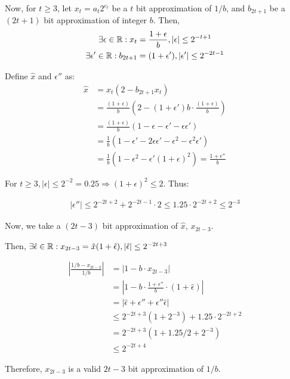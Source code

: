 Now, for $t \ge 3$, let $x_t = a_t 2^{e_t}$ be a $t$ bit approximation of $1/b$, and $b_{2t+1}$ be a $(2t+1)$ bit approximation of integer $b$. Then, 
\begin{align*}
    \exists \epsilon \in \mathbb{R}: x_t &= \frac{1+\epsilon}{b}, |\epsilon| \le 2^{-t+1} \\
    \exists \epsilon' \in \mathbb{R}: b_{2t+1} &= (1+\epsilon'), |\epsilon'| \le 2^{-2t-1}
\end{align*}

Define $\hat{x}$ and $\epsilon''$ as:
\begin{align*}
    \hat{x} &= x_t (2 - b_{2t+1} x_t) \\
    &= \frac{(1+\epsilon)}{b}\left(2 - (1+\epsilon')b \cdot \frac{(1+\epsilon)}{b}\right) \\
    &= \frac{(1+\epsilon)}{b} \left(1 - \epsilon - \epsilon' - \epsilon \epsilon'\right) \\
    &= \frac{1}{b} \left(1 - \epsilon' - 2\epsilon \epsilon' - \epsilon^2 - \epsilon^2\epsilon'\right) \\
    &= \frac{1}{b}\left(1 - \epsilon^2 - \epsilon'(1+\epsilon)^2\right) = \frac{1+\epsilon''}{b}
\end{align*}

For \(t \ge 3, |\epsilon| \le 2^{-2} = 0.25 \Rightarrow (1+\epsilon)^2 \le 2\). Thus:

\begin{align*}
    |\epsilon''| \le 2^{-2t+2} + 2^{-2t-1} \cdot 2 \le 1.25 \cdot 2^{-2t+2} \le 2^{-3}
\end{align*}

Now, we take a $(2t-3)$ bit approximation of $\hat{x}$, $x_{2t-3}$.

Then, \(\exists \hat{\epsilon} \in \mathbb{R}: x_{2t-3} = \hat{x}(1+\hat{\epsilon}), |\hat{\epsilon}| \le 2^{-2t+3}\)

\begin{align*}
    \left|\frac{1/b-x_{2t-3}}{1/b}\right| &= |1 - b \cdot x_{2t-3}| \\
    &= \left|1 - b \cdot \frac{1+\epsilon''}{b} \cdot (1+\hat{\epsilon})\right| \\
    &= |\hat{\epsilon} + \epsilon'' + \epsilon'' \hat{\epsilon}| \\
    &\le 2^{-2t+3}(1 + 2^{-3}) + 1.25 \cdot 2^{-2t+2} \\
    &= 2^{-2t+3}(1+ 1.25/2 + 2^{-3}) \\
    &\le 2^{-2t+4}
\end{align*}

Therefore, $x_{2t-3}$ is a valid $2t-3$ bit approximation of $1/b$.

